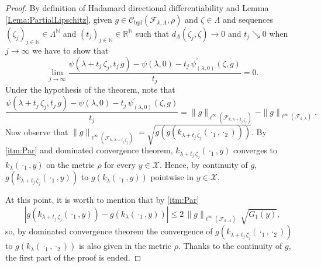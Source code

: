 			\begin{proof}
				By definition of Hadamard directional differentiability and Lemma \ref{Lema:PartialLipschitz}, given $g\in\mathcal{C}_{\operatorname{bpl}}\left(\mathcal{F}_{k,\Lambda},\rho\right)$ and $\zeta\in\Lambda$ and sequences $\left(\zeta_{j}\right)_{j\in\mathbb{N}}\in\Lambda^{\mathbb{N}}$ and $\left(t_{j}\right)_{j\in\mathbb{N}}\in\mathbb{R}^{\mathbb{N}}$ such that $d_{\Lambda}\left(\zeta_{j},\zeta\right)\longrightarrow0$ and $t_{j}\searrow0$ when $j\longrightarrow\infty$ we have to show that
				\begin{equation}
					\lim_{j\longrightarrow\infty}\frac{\psi\left(\lambda+t_{j}\,\zeta_{j},t_{j}\,g\right)-\psi(\lambda,0)-t_{j}\,\psi_{(\lambda,0)}^{\prime}\left(\zeta,g\right)}{t_{j}}=0.
				\end{equation}
				Under the hypothesis of the theorem, note that
				\begin{equation}
					\frac{\psi\left(\lambda+t_{j}\,\zeta_{j},t_{j}\,g\right)-\psi(\lambda,0)-t_{j}\,\psi_{(\lambda,0)}^{\prime}\left(\zeta,g\right)}{t_{j}}=\|g\|_{\ell^{\infty}\left(\mathcal{F}_{k,\lambda+t_{j}\,\zeta_{j}}\right)}-\|g\|_{\ell^{\infty}\left(\mathcal{F}_{k,\lambda}\right)}.
				\end{equation}
				Now observe that $\|g\|_{\ell^{\infty}\left(\mathcal{F}_{k,\lambda+t_{j}\,\zeta_{j}}\right)}=\sqrt{g\left(g\left(k_{\lambda+t_{j}\,\zeta_{j}}\left(\cdot_{1},\cdot_{2}\right)\right)\right)}$. By \ref{itm:Par} and dominated convergence theorem, $k_{\lambda+t_{j}\,\zeta_{j}}\left(\cdot_{1},y\right)$ converges to $k_{\lambda}\left(\cdot_{1},y\right)$ on the metric $\rho$ for every $y\in\mathcal{X}$. Hence, by continuity of $g$, $g\left(k_{\lambda+t_{j}\,\zeta_{j}}\left(\cdot_{1},y\right)\right)$ to $g\left(k_{\lambda}\left(\cdot_{1},y\right)\right)$ pointwise in $y\in\mathcal{X}$.
				
				At this point, it is worth to mention that by \ref{itm:Par}
				\begin{equation}
					\left|g\left(k_{\lambda+t_{j}\,\zeta_{j}}\left(\cdot_{1},y\right)\right)-g\left(k_{\lambda}\left(\cdot_{1},y\right)\right)\right|\leq2\,\|g\|_{\ell^{\infty}\left(\mathcal{F}_{k,\Lambda}\right)}\,\sqrt{G_{1}(y)},
				\end{equation}
				so, by dominated convergence theorem the convergence of $g\left(k_{\lambda+t_{j}\,\zeta_{j}}\left(\cdot_{1},\cdot_{2}\right)\right)$ to $g\left(k_{\lambda}\left(\cdot_{1},\cdot_{2}\right)\right)$ is also given in the metric $\rho$. Thanks to the continuity of $g$, the first part of the proof is ended.
			\end{proof}
